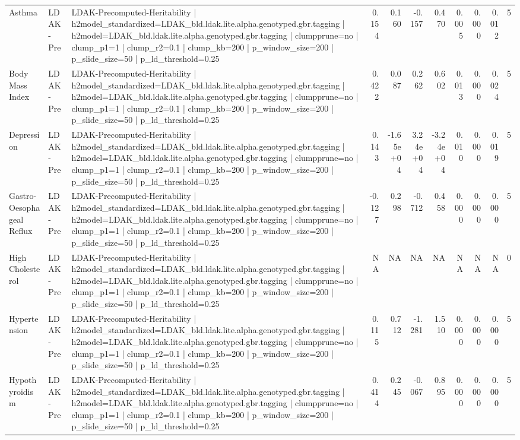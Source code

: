 \begin{landscape}
\begin{longtable}{p{2.4cm}p{1.8cm}p{6.0cm}rrrrrrrr}
Asthma & LDAK-Pre & LDAK-Precomputed-Heritability | h2model\_standardized=LDAK\_bld.ldak.lite.alpha.genotyped.gbr.tagging | h2model=LDAK\_bld.ldak.lite.alpha.genotyped.gbr.tagging | clumpprune=no | clump\_p1=1 | clump\_r2=0.1 | clump\_kb=200 | p\_window\_size=200 | p\_slide\_size=50 | p\_ld\_threshold=0.25 & 0.154 & 0.160 & -0.157 & 0.470 & 0.005 & 0.000 & 0.012 & 5 \\
Body Mass Index & LDAK-Pre & LDAK-Precomputed-Heritability | h2model\_standardized=LDAK\_bld.ldak.lite.alpha.genotyped.gbr.tagging | h2model=LDAK\_bld.ldak.lite.alpha.genotyped.gbr.tagging | clumpprune=no | clump\_p1=1 | clump\_r2=0.1 | clump\_kb=200 | p\_window\_size=200 | p\_slide\_size=50 | p\_ld\_threshold=0.25 & 0.422 & 0.087 & 0.262 & 0.602 & 0.013 & 0.000 & 0.024 & 5 \\
Depression & LDAK-Pre & LDAK-Precomputed-Heritability | h2model\_standardized=LDAK\_bld.ldak.lite.alpha.genotyped.gbr.tagging | h2model=LDAK\_bld.ldak.lite.alpha.genotyped.gbr.tagging | clumpprune=no | clump\_p1=1 | clump\_r2=0.1 | clump\_kb=200 | p\_window\_size=200 | p\_slide\_size=50 | p\_ld\_threshold=0.25 & 0.143 & -1.65e+04 & 3.24e+04 & -3.24e+04 & 0.010 & 0.000 & 0.019 & 5 \\
Gastro-Oesophageal Reflux & LDAK-Pre & LDAK-Precomputed-Heritability | h2model\_standardized=LDAK\_bld.ldak.lite.alpha.genotyped.gbr.tagging | h2model=LDAK\_bld.ldak.lite.alpha.genotyped.gbr.tagging | clumpprune=no | clump\_p1=1 | clump\_r2=0.1 | clump\_kb=200 | p\_window\_size=200 | p\_slide\_size=50 | p\_ld\_threshold=0.25 & -0.127 & 0.298 & -0.712 & 0.458 & 0.000 & 0.000 & 0.000 & 5 \\
High Cholesterol & LDAK-Pre & LDAK-Precomputed-Heritability | h2model\_standardized=LDAK\_bld.ldak.lite.alpha.genotyped.gbr.tagging | h2model=LDAK\_bld.ldak.lite.alpha.genotyped.gbr.tagging | clumpprune=no | clump\_p1=1 | clump\_r2=0.1 | clump\_kb=200 | p\_window\_size=200 | p\_slide\_size=50 | p\_ld\_threshold=0.25 & NA & NA & NA & NA & NA & NA & NA & 0 \\
Hypertension & LDAK-Pre & LDAK-Precomputed-Heritability | h2model\_standardized=LDAK\_bld.ldak.lite.alpha.genotyped.gbr.tagging | h2model=LDAK\_bld.ldak.lite.alpha.genotyped.gbr.tagging | clumpprune=no | clump\_p1=1 | clump\_r2=0.1 | clump\_kb=200 | p\_window\_size=200 | p\_slide\_size=50 | p\_ld\_threshold=0.25 & 0.115 & 0.712 & -1.281 & 1.510 & 0.000 & 0.000 & 0.000 & 5 \\
Hypothyroidism & LDAK-Pre & LDAK-Precomputed-Heritability | h2model\_standardized=LDAK\_bld.ldak.lite.alpha.genotyped.gbr.tagging | h2model=LDAK\_bld.ldak.lite.alpha.genotyped.gbr.tagging | clumpprune=no | clump\_p1=1 | clump\_r2=0.1 | clump\_kb=200 | p\_window\_size=200 | p\_slide\_size=50 | p\_ld\_threshold=0.25 & 0.414 & 0.245 & -0.067 & 0.895 & 0.000 & 0.000 & 0.000 & 5 \\

\end{longtable}
\end{landscape}
